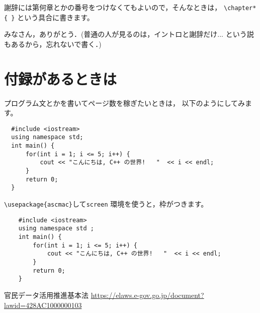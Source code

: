 \documentclass[a4paper, 12pt]{jsreport}
\begin{document}
  謝辞には第何章とかの番号をつけなくてもよいので，そんなときは，
  \verb|\chapter*{ }| という具合に書きます。

  みなさん，ありがとう．(普通の人が見るのは，イントロと謝辞だけ...
  という説もあるから，忘れないで書く．)

  \appendix
  \chapter{付録があるときは}
  プログラム文とかを書いてページ数を稼ぎたいときは， 以下のようにしてみます。

  \begin{verbatim}
  #include <iostream>
  using namespace std;
  int main() {
      for(int i = 1; i <= 5; i++) {
          cout << "こんにちは, C++ の世界!   "  << i << endl;
      }
      return 0;
  }
  \end{verbatim}
  \verb|\usepackage{ascmac}|して\verb|screen| 環境を使うと，枠がつきます。
  \begin{screen}
    \begin{verbatim}
    #include <iostream>
    using namespace std ;
    int main() {
        for(int i = 1; i <= 5; i++) {
            cout << "こんにちは, C++ の世界!   "  << i << endl;
        }
        return 0;
    }
    \end{verbatim}
  \end{screen}

  \begin{thebibliography}{99}
     官民データ活用推進基本法 \url{https://elaws.e-gov.go.jp/document?lawid=428AC1000000103}
  \end{thebibliography}
\end{document}
